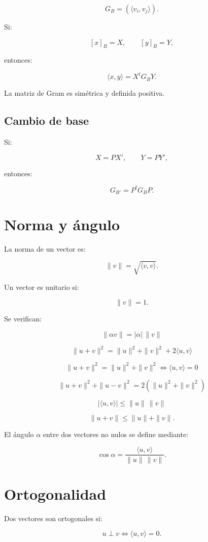 \documentclass[11pt,a4paper]{article}
\begin{document}
\[
\boxed{
G_B=
\left(
\langle v_i,v_j\rangle
\right).
}
\]

Si:

\[
[x]_B=X,
\qquad
[y]_B=Y,
\]

entonces:

\[
\boxed{
\langle x,y\rangle
=
X^tG_BY.
}
\]

La matriz de Gram es simétrica y definida positiva.

\subsection{Cambio de base}

Si:

\[
X=PX',
\qquad
Y=PY',
\]

entonces:

\[
\boxed{
G_{B'}
=
P^tG_BP.
}
\]

\section{Norma y ángulo}

La norma de un vector es:

\[
\boxed{
\|v\|
=
\sqrt{\langle v,v\rangle}.
}
\]

Un vector es unitario si:

\[
\|v\|=1.
\]

Se verifican:

\[
\|\alpha v\|
=
|\alpha|\,\|v\|
\]

\[
\|u+v\|^2
=
\|u\|^2+\|v\|^2+2\langle u,v\rangle
\]

\[
\boxed{
\|u+v\|^2=\|u\|^2+\|v\|^2
\iff
\langle u,v\rangle=0
}
\]

\[
\boxed{
\|u+v\|^2+\|u-v\|^2
=
2\left(
\|u\|^2+\|v\|^2
\right)
}
\]

\[
\boxed{
|\langle u,v\rangle|
\leq
\|u\|\,\|v\|
}
\]

\[
\boxed{
\|u+v\|
\leq
\|u\|+\|v\|.
}
\]

El ángulo $\alpha$ entre dos vectores no nulos se define mediante:

\[
\boxed{
\cos\alpha
=
\frac{\langle u,v\rangle}
{\|u\|\,\|v\|}.
}
\]

\section{Ortogonalidad}

Dos vectores son ortogonales si:

\[
\boxed{
u\perp v
\iff
\langle u,v\rangle=0.
}
\]
\end{document}
